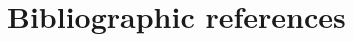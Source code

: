 \section*{Bibliographic references}
\label{10-sec:references}


%
%
%
%
%
%
%
%
%
%
%
%
%
%
%
%
%
%

